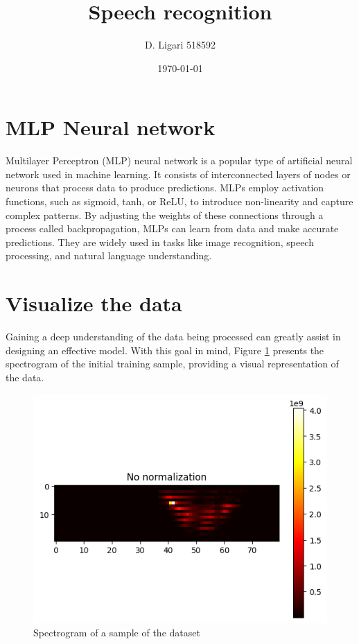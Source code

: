 \documentclass[eng]{class}
\title{Speech recognition}
\author[1]{D. Ligari 518592}
\affil[1]{Machine Learning course, University of Pavia, Department of Computer Engineering (Data Science), Pavia, Italy}
\date{\today}
\begin{document}
\maketitle
\thispagestyle{FirstPage}

\section{MLP Neural network}
Multilayer Perceptron (MLP) neural network is a popular type of artificial neural network used in machine learning.
It consists of interconnected layers of nodes or neurons that process data to produce predictions.
MLPs employ activation functions, such as sigmoid, tanh, or ReLU, to introduce non-linearity and capture complex patterns.
By adjusting the weights of these connections through a process called backpropagation, MLPs can learn from data and make accurate predictions.
They are widely used in tasks like image recognition, speech processing, and natural language understanding.

\section{Visualize the data}
Gaining a deep understanding of the data being processed can greatly assist in designing an effective model.
With this goal in mind, Figure \ref{fig-1} presents the spectrogram of the initial training sample, providing a visual representation of the data.

\begin{figure}[h]
  \centering
  \includegraphics[width=.6\columnwidth]{images/sample_spectrogram.png}
  \caption{Spectrogram of a sample of the dataset}
  \label{fig-1}
\end{figure}
\end{document}
